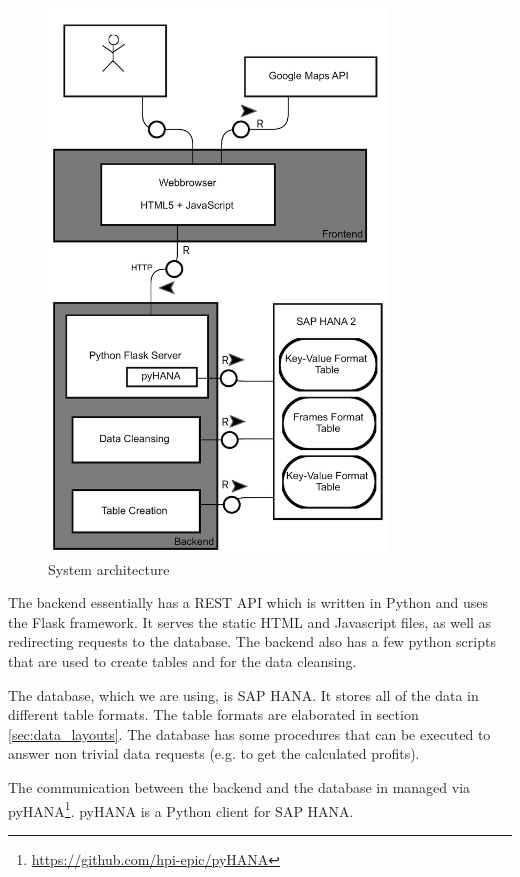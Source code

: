 \documentclass[10pt]{sig-alternate}
\begin{document}
\begin{figure}
\centering
\includegraphics[width=0.8\textwidth]{img/architecture.png}
\caption{System architecture}
\label{fig:architecture}
\end{figure}

The backend essentially has a REST API which is written in Python and uses the Flask framework. It serves the static HTML and Javascript files, as well as redirecting requests to the database. The backend also has a few python scripts that are used to create tables and for the data cleansing.

The database, which we are using, is SAP HANA. It stores all of the data in different table formats. The table formats are elaborated in section \ref{sec:data_layouts}. The database has some procedures that can be executed to answer non trivial data requests (e.g. to get the calculated profits). 

The communication between the backend and the database in managed via pyHANA\footnote{\href{https://github.com/hpi-epic/pyHANA}{https://github.com/hpi-epic/pyHANA}}. pyHANA is a Python client for SAP HANA.
\end{document}
